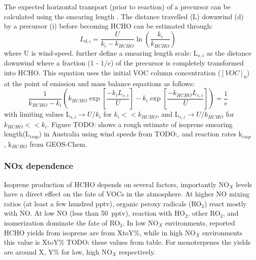       The expected horizontal transport (prior to reaction) of a precursor can be calculated using the smearing length \parencite{Palmer2003}.
      The distance travelled (L) downwind (d) by a precursor (i) before becoming HCHO can be estimated through:
      \begin{equation*}
        L_{d,i} = \frac{U}{k_i - k_{HCHO}} \ln{ \left( \frac{k_i}{k_{HCHO}} \right) }
      \end{equation*}
      where U is wind-speed.
      \textcite{Palmer2003} further define a smearing length scale: L$_{s,i}$ as the distance downwind where a fraction (1 - $1/e$) of the precursor is completely transformed into HCHO.
      This equation uses the initial VOC column concentration ($[VOC]_0$) at the point of emission and mass balance equations as follows:
      \begin{equation}
      \frac{1}{k_{HCHO}-k_i} \left( k_{HCHO} \exp{ \left[ \frac{-k_i L_{s,i}}{U} \right]} -k_i \exp{ \left[ \frac{-k_{HCHO} L_{s,i}}{U} \right]} \right) = \frac{1}{e} 
      \end{equation}
      with limiting values L$_{s,i} \rightarrow U/k_i$ for $k_i << k_{HCHO}$, and L$_{s,i} \rightarrow U/k_{HCHO}$ for $k_{HCHO} << k_i$.
      Figure TODO: shows a rough estimate of isoprene smearing length(L$_{isop}$) in Australia using wind speeds from TODO:, and reaction rates k$_{isop}$, k$_{HCHO}$ from GEOS-Chem.
    
    \subsubsection{NOx dependence}
      
      Isoprene production of HCHO depends on several factors, importantly NO$_X$ levels have a direct effect on the fate of VOCs in the atmosphere.
      At higher NO mixing ratios (at least a few hundred pptv), organic peroxy radicals (RO$_2$) react mostly with NO. 
      At low NO (less than 50~pptv), reaction with HO$_2$, other RO$_2$, and isomerization dominate the fate of RO$_2$.
      In low NO$_X$ environments, reported HCHO yields from isoprene are from XtoY\%, while in high NO$_X$ environments this value is XtoY\% TODO: these values from table.
      For monoterpenes the yields are around X, Y\% for low, high NO$_X$ respectively.
      

